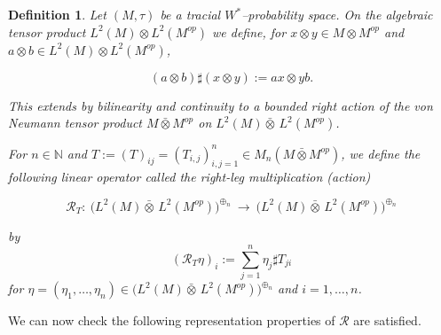 \documentclass[10pt,a4paper,reqno]{amsart}
\newtheorem{definition}[theorem]{Definition}
\begin{document}
\begin{definition}\label{def:right-action-RS-explicit}
Let $(M,\tau)$ be a tracial $W^\ast$–probability space. On the algebraic tensor product
$L^2(M)\otimes L^2(M^{op})$ we define, for $x\otimes y\in M\otimes M^{op}$ and
$a\otimes b\in L^2(M)\otimes L^2(M^{op})$,


\[
(a\otimes b)\sharp(x\otimes y) := a x\otimes y b.
\]


This extends by bilinearity and continuity to a bounded right action of the von Neumann tensor
product $M\bar\otimes M^{op}$ on $L^2(M){\bar\otimes}\,L^2(M^{op})$.

For $n\in\mathbb N$ and $T := (T)_{ij}=(T_{i,j})_{i,j=1}^n\in M_n(M\bar\otimes M^{op})$, we define the following linear operator called the
\emph{right-leg} multiplication (action)


\[
\mathcal R_T:\ \big(L^2(M){\bar\otimes}\,L^2(M^{op})\big)^{\oplus_n}\ \longrightarrow\ 
\big(L^2(M){\bar\otimes}\,L^2(M^{op})\big)^{\oplus_n}
\]


by
\begin{equation}
(\mathcal R_T\eta)_i := \sum_{j=1}^n \eta_j\sharp T_{ji}
\end{equation}
for $\eta = (\eta_1,\dots,\eta_n)\in \big(L^2(M){\bar\otimes}\,L^2(M^{op})\big)^{\oplus_n}$ and
$i=1,\dots,n$. 
\bigbreak
\end{definition}
\begin{flushleft}
    We can now check the following representation properties of $\mathcal{R}$ are satisfied. 
\end{flushleft}
\end{document}

